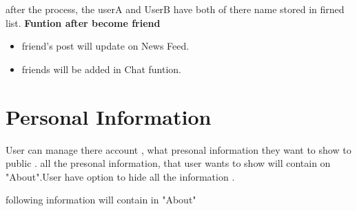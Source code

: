 after the process, the userA and UserB have both of there name stored in firned
list.
\textbf{Funtion after become friend}
\begin{itemize}
\item friend's post will update on News Feed.
\item friends will be added in Chat funtion.
\end{itemize}

\section{Personal Information}
User can manage there account , what presonal information they want to show to public .
all the presonal information,  that user wants to show will contain on "About".User have option to hide all the information .

following information will contain in "About"

